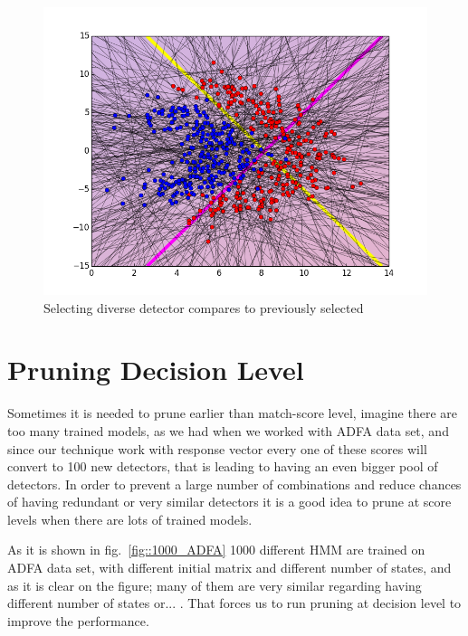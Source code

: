 \begin{figure}[H]
\centering
\includegraphics[width=1\linewidth]{figs/Lithuanian/complement_detectors}
\caption{Selecting diverse detector compares to previously selected}
\label{fig::diverse_detector}
\end{figure}

\section{Pruning Decision Level}
\label{sec:decision-level}

Sometimes it is needed to prune earlier than match-score level, imagine there are too many trained models, as we had when we worked with ADFA data set, and since our technique work with response vector every one of these scores will convert to 100 new detectors, that is leading to having an even bigger pool of detectors. In order to prevent a large number of combinations and reduce chances of having redundant or very similar detectors it is a good idea to prune at score levels when there are lots of trained models. 

As it is shown in fig.~\ref{fig::1000_ADFA} 1000 different HMM are trained on ADFA data set, with different initial matrix and different number of states, and as it is clear on the figure; many of them are very similar regarding having different number of states or... . That forces us to run pruning at decision level to improve the performance.

